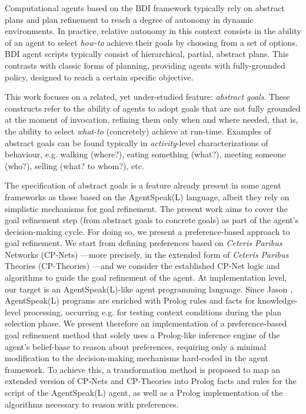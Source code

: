 Computational agents based on the BDI framework typically rely on abstract plans and plan refinement to reach a degree of autonomy in dynamic environments. In practice, relative autonomy in this context consists in the ability of an agent to select \textit{how-to} achieve their goals by choosing from a set of options. BDI agent scripts typically consist of hierarchical, partial, abstract plans. This contrasts with classic forms of planning, providing agents with fully-grounded policy, designed to reach a certain specific objective. 

This work focuses on a related, yet under-studied feature: %
\textit{abstract goals}. These constructs refer to the ability of agents to adopt goals that are not fully grounded at the moment of invocation, refining them only when and where needed, that is, the ability to select \textit{what-to} (concretely) achieve at run-time. Examples of abstract goals can be found typically in \textit{activity}-level characterizations of behaviour, e.g. walking (where?), eating something (what?), meeting someone (who?), selling (what? to whom?), etc. 

The specification of abstract goals is a feature already present in some agent frameworks as those based on the AgentSpeak(L) language, albeit they rely on simplistic mechanisms for goal refinement. The present work aims to cover the goal refinement step (from abstract goals to concrete goals) as part of the agent's decision-making cycle. For doing so, 
we present a preference-based approach to goal refinement. We start from defining preferences based on \textit{Ceteris Paribus} Networks (CP-Nets) \cite{Boutilier2004}---more precisely, in the extended form of \textit{Ceteris Paribus} Theories (CP-Theories) \cite{Wilson2004}---and we consider the established CP-Net logic and algorithms to guide the goal refinement of the agent. At implementation level, our target is an AgentSpeak(L)-like \cite{RaoAS1996} agent programming language. Since Jason \cite{Bordini2005},  AgentSpeak(L) programs are enriched with Prolog rules and facts for knowledge-level processing, occurring e.g. for testing context conditions during the plan selection phase. We present therefore an implementation of a preference-based goal refinement method that solely uses a Prolog-like inference engine of the agent's belief-base to reason about preferences, requiring only a minimal modification to the decision-making mechanisms hard-coded in the agent framework. To achieve this, a transformation method is proposed to map an extended version of CP-Nets and CP-Theories into Prolog facts and rules for the script of the AgentSpeak(L) agent, as well as a Prolog implementation of the algorithms necessary to reason with preferences.

